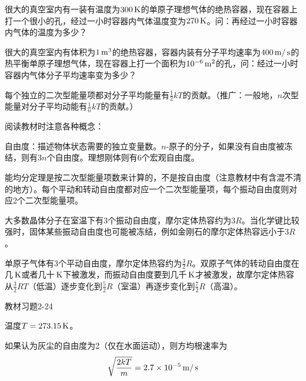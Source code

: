 \documentclass[CJK]{beamer}
\begin{document}
\begin{frame}
\bch
{}

很大的真空室内有一装有温度为$300\,\mathrm{K}$的单原子理想气体的绝热容器，现在容器上打一个很小的孔，经过一小时容器内气体温度变为$270\,\mathrm{K}$。问：再经过一小时容器内气体的温度为多少？
\ech
\end{frame}



\begin{frame}
\bch
{}

很大的真空室内有体积为$1\,\mathrm{m}^3$的绝热容器，容器内装有分子平均速率为$400\,\mathrm{m}/\,\mathrm{s}$的热平衡单原子理想气体，现在容器上打一个面积为$10^{-6}\,\mathrm{m}^2$的孔，问：经过一小时容器内气体分子平均速率变为多少？
\ech
\end{frame}



\begin{frame}
\bch
{\small
{\blue 每个独立的二次型能量项都对分子平均能量有$\frac{1}{2}kT$的贡献。（推广：一般地，$n$次型能量对分子平均动能有$\frac{1}{n}kT$的贡献。）}

阅读教材时注意各种概念：
\bitem
\item{自由度：描述物体状态需要的独立变量数。$n$-原子的分子，如果没有自由度被冻结，则有$3n$个自由度。理想刚体则有6个宏观自由度。}
\item{能均分定理是按二次型能量项数来计算的，不是按自由度（注意教材中有含混不清的地方）。每个平动和转动自由度都对应一个二次型能量项，每个振动自由度则对应2个二次型能量项。}
\item{大多数晶体分子在室温下有3个振动自由度，摩尔定体热容约为$3R$。当化学键比较强时，固体某些振动自由度也可能被冻结，例如金刚石的摩尔定体热容远小于$3R$。}
\item{单原子气体有3个平动自由度，摩尔定体热容约为$\frac{3}{2}R$。双原子气体的转动自由度在几$\,\mathrm{K}$或者几十$\,\mathrm{K}$下被激发，而振动自由度要到几千$\,\mathrm{K}$才被激发，故摩尔定体热容从$\frac{3}{2}RT$（低温）逐步变化到$\frac{5}{2}R$（室温）再逐步变化到$\frac{7}{2}R$（高温）。}
\eitem
}
\ech
\end{frame}

\begin{frame}
\bch
{\blue 教材习题2-24}

\skipline

{\small
温度$T = 273.15\,\mathrm{K}$。

如果认为灰尘的自由度为2（仅在水面运动），则方均根速率为
$$\sqrt{\frac{2kT}{m}} = 2.7\times 10^{-5} \,\mathrm{m}/\,\mathrm{s}$$  
}

\ech
\end{frame}
\end{document}
